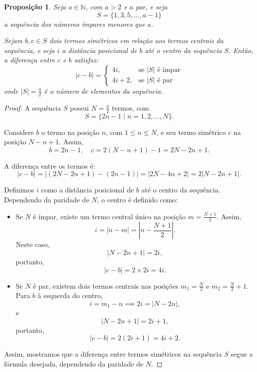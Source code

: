 \documentclass[a4paper,11pt]{article}
\newtheorem{proposition}[theorem]{Proposição}
\theoremstyle{definition}
\theoremstyle{remark}
\begin{document}
\begin{otherlanguage}{brazil}
	\begin{proposition}\label{prop:distancia_simetrica}
		Seja $a \in \mathbb{N}$, com $a > 2$ e $a$ par, e seja
		\[
		S = \{1, 3, 5, \dotsc, a - 1\}
		\]
		a sequência dos números ímpares menores que $a$.
		
		Sejam $b, c \in S$ dois termos simétricos em relação aos termos centrais da sequência, e seja $i$ a distância posicional de $b$ até o centro da sequência $S$. Então, a diferença entre $c$ e $b$ satisfaz:
		\[
		|c - b| =
		\begin{cases}
			4i, & \text{se } |S| \text{ é ímpar} \\
			4i + 2, & \text{se } |S| \text{ é par}
		\end{cases}
		\]
		onde $|S| = \frac{a}{2}$ é o número de elementos da sequência.
	\end{proposition}
	
	\begin{proof}
		A sequência $S$ possui $N = \frac{a}{2}$ termos, com
		\[
		S = \{2n - 1 \mid n = 1, 2, \dotsc, N\}.
		\]
		
		Considere $b$ o termo na posição $n$, com $1 \leq n \leq N$, e seu termo simétrico $c$ na posição $N - n + 1$. Assim,
		\[
		b = 2n - 1, \quad c = 2(N - n + 1) - 1 = 2N - 2n + 1.
		\]
		
		A diferença entre os termos é:
		\[
		|c - b| = |(2N - 2n + 1) - (2n - 1)| = |2N - 4n + 2| = 2|N - 2n + 1|.
		\]
		
		Definimos $i$ como a distância posicional de $b$ até o centro da sequência. Dependendo da paridade de $N$, o centro é definido como:
		
		\begin{itemize}
			\item Se $N$ é ímpar, existe um termo central único na posição $m = \frac{N+1}{2}$. Assim,
			\[
			i = |n - m| = \left| n - \frac{N+1}{2} \right|.
			\]
			Neste caso,
			\[
			|N - 2n + 1| = 2i,
			\]
			portanto,
			\[
			|c - b| = 2 \times 2i = 4i.
			\]
			
			\item Se $N$ é par, existem dois termos centrais nas posições $m_1 = \frac{N}{2}$ e $m_2 = \frac{N}{2} + 1$. Para $b$ à esquerda do centro,
			\[
			i = m_1 - n \implies 2i = |N - 2n|,
			\]
			e
			\[
			|N - 2n + 1| = 2i + 1,
			\]
			portanto,
			\[
			|c - b| = 2(2i + 1) = 4i + 2.
			\]
		\end{itemize}
		
		Assim, mostramos que a diferença entre termos simétricos na sequência $S$ segue a fórmula desejada, dependendo da paridade de $N$.
		

\end{proof}
\end{otherlanguage}
\end{document}
